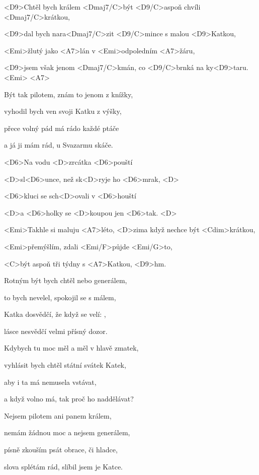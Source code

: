 

\zs
<D9>Chtěl bych králem <Dmaj7/C>být <D9/C>aspoň chvíli <Dmaj7/C>krátkou, 

<D9>dal bych nara<Dmaj7/C>zit <D9/C>mince s malou <D9>Katkou, 

<Emi>žlutý jako <A7>lán v <Emi>odpoledním <A7>žáru, 

<D9>jsem však jenom <Dmaj7/C>kmán, co <D9/C>brnká na ky<D9>taru. <Emi> <A7> \ks

\zs
Být tak pilotem, znám to jenom z knížky,

vyhodil bych ven svoji Katku z výšky,

přece volný pád má rádo každé ptáče

a já ji mám rád, u Svazarmu skáče.
\ks

\zr
<D6>Na vodu <D>zrcátka <D6>pouští

<D>sl<D6>unce, než sk<D>ryje ho <D6>mrak, <D> 

<D6>kluci se sch<D>ovali v <D6>houští 

<D>a <D6>holky se <D>koupou jen <D6>tak. <D> 

<Emi>Takhle si maluju <A7>léto, <D>zima když nechce být <Cdim>krátkou, 

<Emi>přemýšlím, zdali <Emi/F>půjde <Emi/G>to, 

<C>být aspoň tři týdny s <A7>Katkou, <D9>hm.
\kr

\zs
Rotným být bych chtěl nebo generálem, 

to bych nevelel, spokojil se s málem, 

Katka dosvědčí, že když se velí: , 

lásce nesvědčí velmi přísný dozor. 
\ks

\zs
Kdybych tu moc měl a měl v hlavě zmatek, 

vyhlásit bych chtěl státní svátek Katek, 

aby i ta má nemusela vstávat,

a když volno má, tak proč ho naddělávat? 
\ks

\zr \kr

\zs
Nejsem pilotem ani panem králem, 

nemám žádnou moc a nejsem generálem, 

písně zkouším psát obrace, či hladce, 

slova splétám rád, slíbil jsem je Katce.
\ks

\kp
